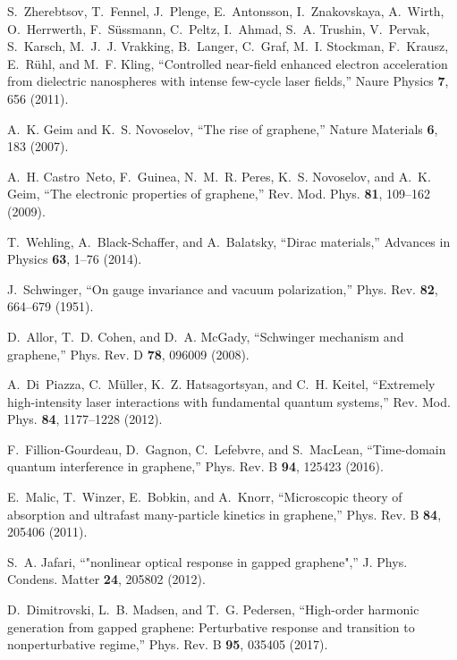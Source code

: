 \documentclass[9pt,twocolumn,twoside]{osajnl}
\begin{document}
\begin{thebibliography}{10}
S.~Zherebtsov, T.~Fennel, J.~Plenge, E.~Antonsson, I.~Znakovskaya, A.~Wirth,
  O.~Herrwerth, F.~S\"ussmann, C.~Peltz, I.~Ahmad, S.~A. Trushin, V.~Pervak,
  S.~Karsch, M.~J.~J. Vrakking, B.~Langer, C.~Graf, M.~I. Stockman, F.~Krausz,
  E.~R{\"u}hl, and M.~F. Kling, \enquote{Controlled near-field enhanced
  electron acceleration from dielectric nanospheres with intense few-cycle
  laser fields,} Naure Physics \textbf{7}, 656 (2011).

A.~K. Geim and K.~S. Novoselov, \enquote{The rise of graphene,} Nature
  Materials \textbf{6}, 183 (2007).

A.~H. Castro~Neto, F.~Guinea, N.~M.~R. Peres, K.~S. Novoselov, and A.~K. Geim,
  \enquote{The electronic properties of graphene,} Rev. Mod. Phys. \textbf{81},
  109--162 (2009).

T.~Wehling, A.~Black-Schaffer, and A.~Balatsky, \enquote{Dirac materials,}
  Advances in Physics \textbf{63}, 1--76 (2014).

J.~Schwinger, \enquote{On gauge invariance and vacuum polarization,} Phys. Rev.
  \textbf{82}, 664--679 (1951).

D.~Allor, T.~D. Cohen, and D.~A. McGady, \enquote{Schwinger mechanism and
  graphene,} Phys. Rev. D \textbf{78}, 096009 (2008).

A.~Di~Piazza, C.~M\"uller, K.~Z. Hatsagortsyan, and C.~H. Keitel,
  \enquote{Extremely high-intensity laser interactions with fundamental quantum
  systems,} Rev. Mod. Phys. \textbf{84}, 1177--1228 (2012).

F.~Fillion-Gourdeau, D.~Gagnon, C.~Lefebvre, and S.~MacLean,
  \enquote{Time-domain quantum interference in graphene,} Phys. Rev. B
  \textbf{94}, 125423 (2016).

E.~Malic, T.~Winzer, E.~Bobkin, and A.~Knorr, \enquote{Microscopic theory of
  absorption and ultrafast many-particle kinetics in graphene,} Phys. Rev. B
  \textbf{84}, 205406 (2011).

S.~A. Jafari, \enquote{"nonlinear optical response in gapped graphene",} J.
  Phys. Condens. Matter \textbf{24}, 205802 (2012).

D.~Dimitrovski, L.~B. Madsen, and T.~G. Pedersen, \enquote{High-order harmonic
  generation from gapped graphene: Perturbative response and transition to
  nonperturbative regime,} Phys. Rev. B \textbf{95}, 035405 (2017).


\end{thebibliography}
\end{document}
